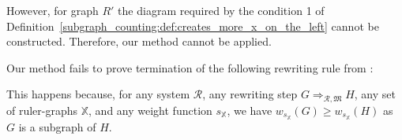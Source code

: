 \begin{example}[Limitation]
    \begin{center}
  \end{center}
  However, for graph $R'$ the diagram required by the condition 1 of Definition~\ref{subgraph_counting:def:creates_more_x_on_the_left} cannot be constructed. Therefore, our method cannot be applied.
\end{example}

\begin{example}[Limitation]
    \label{ex:endrullis:d3:limitation}  
    Our method fails to prove termination of the following rewriting rule from \cite[Example D.3]{endrullis2024generalized_arxiv_v2}:
    \begin{center}
  \end{center}

    This happens because, for any system $\mathcal{R}$, any rewriting step $G \mathop{\Rightarrow}_{\mathcal{R},\mathfrak{M}} H$, any set of ruler-graphs $\mathbb{X}$, and any weight function $s_\mathbb{X}$, we have $w_{s_\mathbb{X}}(G) \mathop{\geq} w_{s_\mathbb{X}}(H)$ as $G$ is a subgraph of $H$.
  \end{example} 

